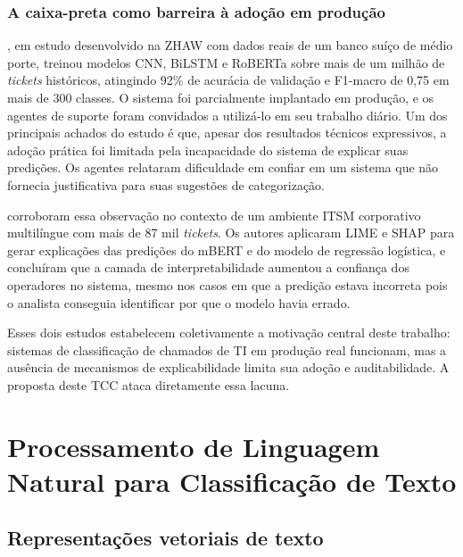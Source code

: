 \documentclass[
    12pt,                %
    openright,           %
    oneside,             %
    a4paper,             %
    english,             %
    brazil               %
]{abntex2}
\begin{document}
\subsubsection{A caixa-preta como barreira à adoção em produção}
\label{subsubsec:helpdesk_caixapreta}

, em estudo desenvolvido na ZHAW com dados reais de um banco suíço de médio porte, treinou modelos CNN, BiLSTM e RoBERTa sobre mais de um milhão de \textit{tickets} históricos, atingindo 92\% de acurácia de validação e F1-macro de 0,75 em mais de 300 classes. O sistema foi parcialmente implantado em produção, e os agentes de suporte foram convidados a utilizá-lo em seu trabalho diário. Um dos principais achados do estudo é que, apesar dos resultados técnicos expressivos, a adoção prática foi limitada pela incapacidade do sistema de explicar suas predições. Os agentes relataram dificuldade em confiar em um sistema que não fornecia justificativa para suas sugestões de categorização.

 corroboram essa observação no contexto de um ambiente ITSM corporativo multilíngue com mais de 87 mil \textit{tickets}. Os autores aplicaram LIME e SHAP para gerar explicações das predições do mBERT e do modelo de regressão logística, e concluíram que a camada de interpretabilidade aumentou a confiança dos operadores no sistema, mesmo nos casos em que a predição estava incorreta pois o analista conseguia identificar por que o modelo havia errado.

Esses dois estudos estabelecem coletivamente a motivação central deste trabalho: sistemas de classificação de chamados de TI em produção real funcionam, mas a ausência de mecanismos de explicabilidade limita sua adoção e auditabilidade. A proposta deste TCC ataca diretamente essa lacuna.

\section{Processamento de Linguagem Natural para Classificação de Texto}
\label{sec:pln}

\subsection{Representações vetoriais de texto}
\label{subsec:pln_representacoes}
\end{document}
